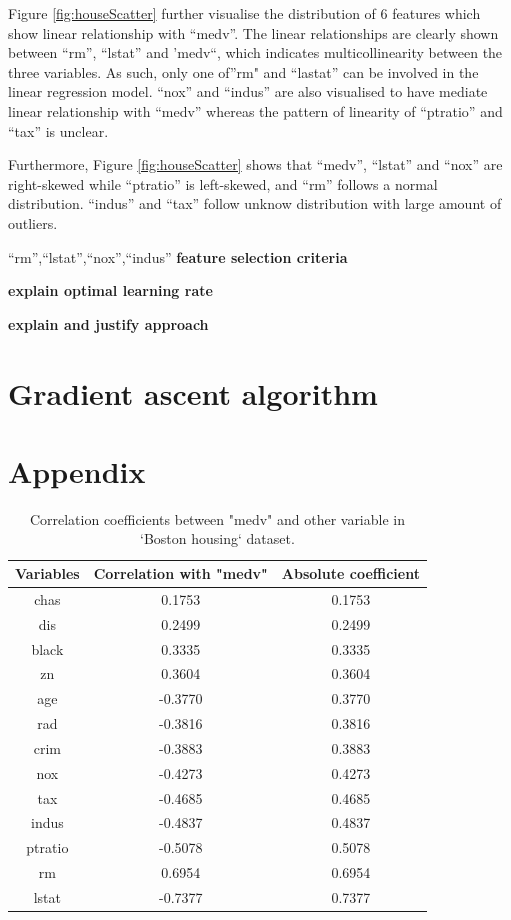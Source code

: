 \documentclass[letterpaper,12pt,twoside,]{pinp}
\begin{document}
Figure \ref{fig:houseScatter} further visualise the distribution of 6
features which show linear relationship with ``medv''. The linear
relationships are clearly shown between ``rm'', ``lstat'' and 'medv``,
which indicates multicollinearity between the three variables. As such,
only one of''rm" and ``lastat'' can be involved in the linear regression
model. ``nox'' and ``indus'' are also visualised to have mediate linear
relationship with ``medv'' whereas the pattern of linearity of
``ptratio'' and ``tax'' is unclear.

Furthermore, Figure \ref{fig:houseScatter} shows that ``medv'',
``lstat'' and ``nox'' are right-skewed while ``ptratio'' is left-skewed,
and ``rm'' follows a normal distribution. ``indus'' and ``tax'' follow
unknow distribution with large amount of outliers.

``rm'',``lstat'',``nox'',``indus'' \textbf{feature selection criteria}

\textbf{explain optimal learning rate}

\textbf{explain and justify approach}

\hypertarget{gradient-ascent-algorithm}{%
\section{Gradient ascent algorithm}\label{gradient-ascent-algorithm}}

\hypertarget{appendix-1}{%
\section{Appendix}\label{appendix-1}}

\begin{table}[ht]
\centering
\begin{tabular}{ |c|c|c|} 
\hline
\textbf{Variables} & \textbf{Correlation with "medv"} & \textbf{Absolute coefficient}\\
\hline
chas & 0.1753 & 0.1753 \\
dis & 0.2499 & 0.2499 \\
black & 0.3335 & 0.3335 \\
zn & 0.3604 & 0.3604 \\
age & -0.3770 & 0.3770 \\
rad & -0.3816 & 0.3816 \\
crim & -0.3883 & 0.3883 \\
nox & -0.4273 & 0.4273 \\
tax &-0.4685 & 0.4685 \\
indus & -0.4837 & 0.4837 \\
ptratio & -0.5078 & 0.5078 \\
rm & 0.6954 & 0.6954 \\
lstat & -0.7377 & 0.7377 \\
\hline
\end{tabular}
\centering
\caption{Correlation coefficients between "medv" and other variable in `Boston housing` dataset.}
\label{table:corrTab}
\end{table}
\end{document}
